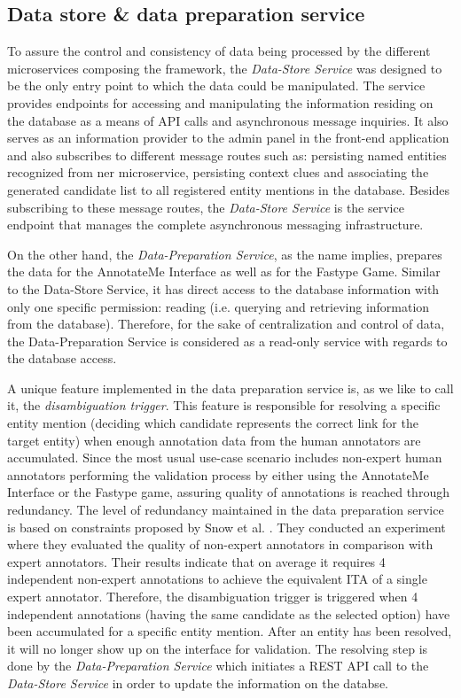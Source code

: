 \subsection{Data store \& data preparation service}
To assure the control and consistency of data being processed by the different microservices composing the framework, the \textit{Data-Store Service} was designed to be the only entry point to which the data could be manipulated. The service provides endpoints for accessing and manipulating the information residing on the database as a means of API calls and asynchronous message inquiries. It also serves as an information provider to the admin panel in the front-end application and also subscribes to different message routes such as: persisting named entities recognized from \ac{ner} microservice, persisting context clues and associating the generated candidate list to all registered entity mentions in the database. Besides subscribing to these message routes, the \textit{Data-Store Service} is the service endpoint that manages the complete asynchronous messaging infrastructure.

On the other hand, the \textit{Data-Preparation Service}, as the name implies, prepares the data for the AnnotateMe Interface as well as for the Fastype Game. Similar to the Data-Store Service, it has direct access to the database information with only one specific permission: reading (i.e. querying and retrieving information from the database). Therefore, for the sake of centralization and control of data, the Data-Preparation Service is considered as a read-only service with regards to the database access.

A unique feature implemented in the data preparation service is, as we like to call it, the \textit{disambiguation trigger}. This feature is responsible for resolving a specific entity mention (deciding which candidate represents the correct link for the target entity) when enough annotation data from the human annotators are accumulated. Since the most usual use-case scenario includes non-expert human annotators performing the validation process by either using the AnnotateMe Interface or the Fastype game, assuring quality of annotations is reached through redundancy. The level of redundancy maintained in the data preparation service is based on constraints proposed by Snow et al. \cite{32}. They conducted an experiment where they evaluated the quality of non-expert annotators in comparison with expert annotators. Their results indicate that on average it requires 4 independent non-expert annotations to achieve the equivalent ITA of a single expert annotator. Therefore, the disambiguation trigger is triggered when 4 independent annotations (having the same candidate as the selected option) have been accumulated for a specific entity mention. After an entity has been resolved, it will no longer show up on the interface for validation. The resolving step is done by the \textit{Data-Preparation Service} which initiates a REST API call to the \textit{Data-Store Service} in order to update the information on the databse.

